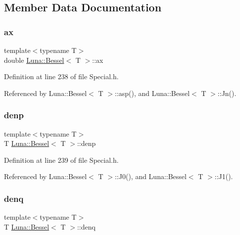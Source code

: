 \subsection{Member Data Documentation}
\mbox{\label{structLuna_1_1Bessel_ace7f3d0a3d4fcca01955bd95cdede89a}} 
\subsubsection{\texorpdfstring{ax}{ax}}
{\footnotesize\ttfamily template$<$typename T$>$ \\
double \hyperlink{structLuna_1_1Bessel}{Luna\+::\+Bessel}$<$ T $>$\+::ax}



Definition at line 238 of file Special.\+h.



Referenced by Luna\+::\+Bessel$<$ T $>$\+::asp(), and Luna\+::\+Bessel$<$ T $>$\+::\+Jn().

\mbox{\label{structLuna_1_1Bessel_a71fa71babc245cef7c0902591ed30fff}} 
\subsubsection{\texorpdfstring{denp}{denp}}
{\footnotesize\ttfamily template$<$typename T$>$ \\
T \hyperlink{structLuna_1_1Bessel}{Luna\+::\+Bessel}$<$ T $>$\+::denp}



Definition at line 239 of file Special.\+h.



Referenced by Luna\+::\+Bessel$<$ T $>$\+::\+J0(), and Luna\+::\+Bessel$<$ T $>$\+::\+J1().

\mbox{\label{structLuna_1_1Bessel_a76731982814bd931ae5e8eb725f22c85}} 
\subsubsection{\texorpdfstring{denq}{denq}}
{\footnotesize\ttfamily template$<$typename T$>$ \\
T \hyperlink{structLuna_1_1Bessel}{Luna\+::\+Bessel}$<$ T $>$\+::denq}



